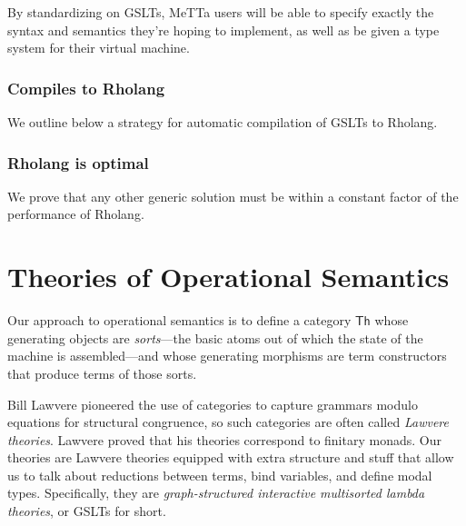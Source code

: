 \documentclass{article}
\begin{document}
By standardizing on GSLTs, MeTTa users will be able to specify exactly the syntax and semantics they're hoping to implement, as well as be given a type system for their virtual machine.

\subsubsection{Compiles to Rholang}

We outline below a strategy for automatic compilation of GSLTs to Rholang.

\subsubsection{Rholang is optimal}

We prove that any other generic solution must be within a constant factor of the performance of Rholang.

\section{Theories of Operational Semantics}

Our approach to operational semantics is to define a category $\mathsf{Th}$ whose generating objects are \emph{sorts}---the basic atoms out of which the state of the machine is assembled---and whose generating morphisms are term constructors that produce terms of those sorts.

Bill Lawvere pioneered the use of categories to capture grammars modulo equations for structural congruence, so such categories are often called \emph{Lawvere theories}. Lawvere proved that his theories correspond to finitary monads. Our theories are Lawvere theories equipped with extra structure and stuff that allow us to talk about reductions between terms, bind variables, and define modal types.  Specifically, they are \emph{graph-structured interactive multisorted lambda theories}, or GSLTs for short.
\end{document}
